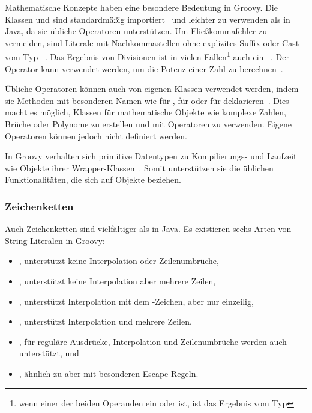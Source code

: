 Mathematische Konzepte haben eine besondere Bedeutung in Groovy.
Die Klassen  und  sind standardmäßig importiert~\cite[{Abs.} 1.]{groovy-lang:differences} und leichter zu verwenden als in Java, da sie übliche Operatoren unterstützen.
Um Fließkommafehler zu vermeiden, sind Literale mit Nachkommastellen ohne explizites Suffix oder Cast vom Typ ~\cite[{Abs.} 5.2.]{groovy-lang:syntax}.
Das Ergebnis von Divisionen ist in vielen Fällen\footnote{wenn einer der beiden Operanden ein  oder  ist, ist das Ergebnis vom Typ } auch ein ~\cite[{Abs.} 5.5.1.]{groovy-lang:syntax}.
Der Operator \code{**} kann verwendet werden, um die Potenz einer Zahl zu berechnen~\cite[{Abs.} 5.5.2.]{groovy-lang:syntax}.

Übliche Operatoren können auch von eigenen Klassen verwendet werden, indem sie Methoden mit besonderen Namen wie  für \code{+},  für \code{<<} oder  für \code{++} deklarieren~\cite[{Abs.} 10.]{groovy-lang:operators}.
Dies macht es möglich, Klassen für mathematische Objekte wie komplexe Zahlen, Brüche oder Polynome zu erstellen und mit Operatoren zu verwenden.
Eigene Operatoren können jedoch nicht definiert werden.

In Groovy verhalten sich primitive Datentypen zu Kompilierungs- und Laufzeit wie Objekte ihrer Wrapper-Klassen~\cite[{Abs.} 10.]{groovy-lang:differences}.
Somit unterstützen sie die üblichen Funktionalitäten, die sich auf Objekte beziehen.

\subsubsection{Zeichenketten}\label{subsubsec:strings}

Auch Zeichenketten sind vielfältiger als in Java.
Es existieren sechs Arten von String-Literalen in Groovy:

\begin{itemize}
\item {}, unterstützt keine Interpolation oder Zeilenumbrüche,
\item {}, unterstützt keine Interpolation aber mehrere Zeilen,
\item {}, unterstützt Interpolation mit dem \code{$}-Zeichen, aber nur einzeilig,
\item {}, unterstützt Interpolation und mehrere Zeilen,
\item {}, für reguläre Ausdrücke, Interpolation und Zeilenumbrüche werden auch unterstützt, und
\item {}, ähnlich zu  aber mit besonderen Escape-Regeln.
\end{itemize}

